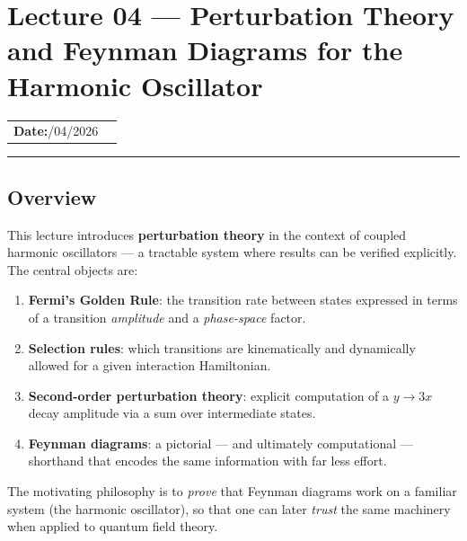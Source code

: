 
\section{Lecture 04 — Perturbation Theory and Feynman Diagrams for the Harmonic Oscillator}\label{sec:lec04:perturbation}
\begin{center}
\begin{tabular}{ll}
  \textbf{Date:}\quad 19/04/2026   & \\
\end{tabular}
\end{center}
\hrule\vspace{1.5em}
\subsection*{Overview}

This lecture introduces \textbf{perturbation theory} in the context of coupled harmonic oscillators — a tractable system where results can be verified explicitly.  The central objects are:
\begin{enumerate}
  \item \textbf{Fermi's Golden Rule}: the transition rate between states expressed in terms of a transition \emph{amplitude} and a \emph{phase-space} factor.
  \item \textbf{Selection rules}: which transitions are kinematically and dynamically allowed for a given interaction Hamiltonian.
  \item \textbf{Second-order perturbation theory}: explicit computation of a $y \to 3x$ decay amplitude via a sum over intermediate states.
  \item \textbf{Feynman diagrams}: a pictorial — and ultimately computational — shorthand that encodes the same information with far less effort.
\end{enumerate}

The motivating philosophy is to \emph{prove} that Feynman diagrams work on a familiar system (the harmonic oscillator), so that one can later \emph{trust} the same machinery when applied to quantum field theory.

